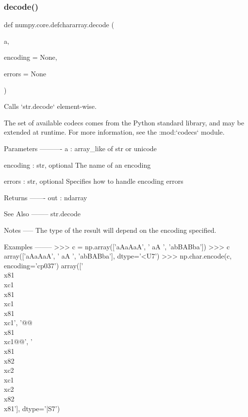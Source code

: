 \subsubsection{\texorpdfstring{decode()}{decode()}}
{\footnotesize\ttfamily def numpy.\+core.\+defchararray.\+decode (\begin{DoxyParamCaption}\item[{}]{a,  }\item[{}]{encoding = {\ttfamily None},  }\item[{}]{errors = {\ttfamily None} }\end{DoxyParamCaption})}

\begin{DoxyVerb}Calls `str.decode` element-wise.

The set of available codecs comes from the Python standard library,
and may be extended at runtime.  For more information, see the
:mod:`codecs` module.

Parameters
----------
a : array_like of str or unicode

encoding : str, optional
   The name of an encoding

errors : str, optional
   Specifies how to handle encoding errors

Returns
-------
out : ndarray

See Also
--------
str.decode

Notes
-----
The type of the result will depend on the encoding specified.

Examples
--------
>>> c = np.array(['aAaAaA', '  aA  ', 'abBABba'])
>>> c
array(['aAaAaA', '  aA  ', 'abBABba'], dtype='<U7')
>>> np.char.encode(c, encoding='cp037')
array(['\\x81\\xc1\\x81\\xc1\\x81\\xc1', '@@\\x81\\xc1@@',
    '\\x81\\x82\\xc2\\xc1\\xc2\\x82\\x81'],
    dtype='|S7')\end{DoxyVerb}
 \mbox{\label{namespacenumpy_1_1core_1_1defchararray_aecca243ca0f2d27e5f08109c62cf68c1}} 
